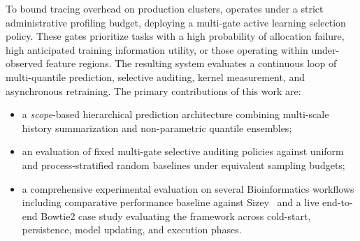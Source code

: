 To bound tracing overhead on production clusters, \toolname{} operates under a strict administrative profiling budget, deploying a multi-gate active learning selection policy. These gates prioritize tasks with a high probability of allocation failure, high anticipated training information utility, or those operating within under-observed feature regions. The resulting system evaluates a continuous loop of multi-quantile prediction, selective auditing, kernel measurement, and asynchronous retraining.
The primary contributions of this work are: 
\begin{itemize}
\item a \textit{scope}-based hierarchical prediction architecture combining multi-scale history summarization and non-parametric quantile ensembles; %
\item  an evaluation of fixed multi-gate selective auditing policies against uniform and process-stratified random baselines under equivalent sampling budgets; 
 \item  a comprehensive experimental evaluation on several Bioinformatics workflows including comparative performance baseline against Sizey~\cite{bader2024sizey} and a live end-to-end Bowtie2 case study evaluating the framework across cold-start, persistence, model updating, and execution phases.
\end{itemize}

